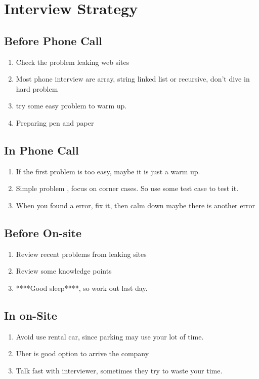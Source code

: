 \chapter{Interview Strategy}

\section{Before Phone Call }

\begin{enumerate}
    \item Check the problem leaking web sites
    \item Most phone interview are array, string linked list or recursive, don't dive in hard problem
    \item try some easy problem to warm up.
    \item Preparing pen and paper
\end{enumerate}

\section{In Phone Call  }

\begin{enumerate}
    \item If the first problem is too easy, maybe it is just a warm up.
    \item Simple problem , focus on corner cases. So use some test case to test it.
    \item When you found  a error, fix it, then calm down maybe there is another error
\end{enumerate}

\section{Before On-site }

\begin{enumerate}
    \item Review recent problems from leaking sites
    \item Review some knowledge points
    \item ****Good sleep****, so work out last day.
\end{enumerate}


\section{In on-Site }
\begin{enumerate}
    \item Avoid use rental car, since parking may use your lot of time.
    \item Uber is good option to arrive the company
    \item Talk fast with interviewer, sometimes they try to waste your time.

\end{enumerate}
